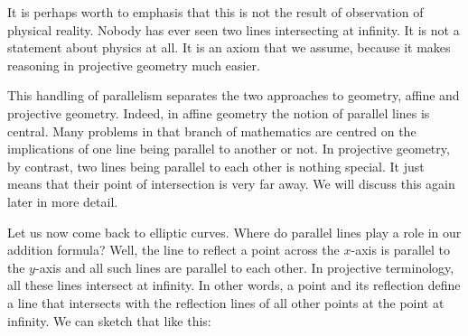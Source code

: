 \documentclass[tikz]{scrreprt}
\begin{document}
It is perhaps worth to emphasis that this is not
the result of observation of physical reality.
Nobody has ever seen two lines intersecting at
infinity. It is not a statement about physics at all.
It is an axiom that we assume, because it makes 
reasoning in projective geometry much easier.

This handling of parallelism separates the two 
approaches to geometry, affine and projective
geometry. Indeed, in affine geometry the notion
of parallel lines is central. Many problems
in that branch of mathematics are centred 
on the implications
of one line being parallel to another or not.
In projective geometry, by contrast, two lines
being parallel to each other is nothing special.
It just means that their point of intersection
is very far away. 
We will discuss this again later
in more detail.

Let us now come back to elliptic curves.
Where do parallel lines play a role in our
addition formula? Well, the line to reflect
a point across the $x$-axis is parallel to
the $y$-axis and all such lines are parallel 
to each other. In projective terminology,
all these lines intersect at infinity.
In other words, a point and its reflection
define a line that intersects with the 
reflection lines of all other points at
the point at infinity.
We can sketch that like this:

\begin{center}
\end{center}
\end{document}
